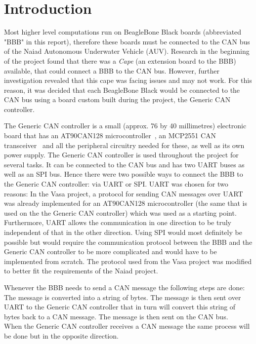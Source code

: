 
\section{Introduction}\label{sec:introduction}
Most higher level computations run on BeagleBone Black boards (abbreviated "BBB" in this report), therefore these boards must be connected to the CAN bus of the Naiad Autonomous Underwater Vehicle (AUV). Research in the beginning of the project found that there was a \emph{Cape} (an extension board to the BBB) available, that could connect a BBB to the CAN bus. However, further investigation revealed that this cape was facing issues and may not work. For this reason, it was decided that each BeagleBone Black would be connected to the CAN bus using a board custom built during the project, the Generic CAN controller. \newline

The Generic CAN controller is a small (approx. 76 by 40 millimetres) electronic board that has an AT90CAN128 microcontroller~\cite{web:at90can}, an MCP2551 CAN transceiver~\cite{web:mcp2551} and all the peripheral circuitry needed for these, as well as its own power supply. The Generic CAN controller is used throughout the project for several tasks. It can be connected to the CAN bus and has two UART buses as well as an SPI bus. \newline
Hence there were two possible ways to connect the BBB to the Generic CAN controller: via UART or SPI. \newline
UART was chosen for two reasons: In the Vasa project, a protocol for sending CAN messages over UART was already implemented for an AT90CAN128 microcontroller (the same that is used on the the Generic CAN controller) which was used as a starting point. Furthermore, UART allows the communication in one direction to be truly independent of that in the other direction. Using SPI would most definitely be possible but would require the communication protocol between the BBB and the Generic CAN controller to be more complicated and would have to be implemented from scratch.  \newline
The protocol used from the Vasa project was modified to better fit the requirements of the Naiad project.

Whenever the BBB needs to send a CAN message the following steps are done: The message is converted into a string of bytes.  The message is then sent over UART to the Generic CAN controller that in turn will convert this string of bytes back to a CAN message. The message is then sent on the CAN bus. \\
When the Generic CAN controller receives a CAN message the same process will be done but in the opposite direction. 

